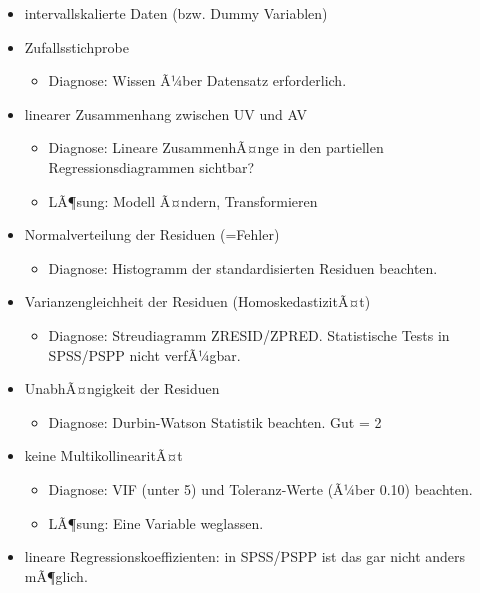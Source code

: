 \documentclass[
]{book}
\providecommand{\tightlist}{%
  \setlength{\itemsep}{0pt}\setlength{\parskip}{0pt}}
\begin{document}
\begin{itemize}
\tightlist
\item
  intervallskalierte Daten (bzw. Dummy Variablen)
\item
  Zufallsstichprobe

  \begin{itemize}
  \tightlist
  \item
    Diagnose: Wissen Ã¼ber Datensatz erforderlich.
  \end{itemize}
\item
  linearer Zusammenhang zwischen UV und AV

  \begin{itemize}
  \tightlist
  \item
    Diagnose: Lineare ZusammenhÃ¤nge in den partiellen Regressionsdiagrammen sichtbar?
  \item
    LÃ¶sung: Modell Ã¤ndern, Transformieren
  \end{itemize}
\item
  Normalverteilung der Residuen (=Fehler)

  \begin{itemize}
  \tightlist
  \item
    Diagnose: Histogramm der standardisierten Residuen beachten.
  \end{itemize}
\item
  Varianzengleichheit der Residuen (HomoskedastizitÃ¤t)

  \begin{itemize}
  \tightlist
  \item
    Diagnose: Streudiagramm ZRESID/ZPRED. Statistische Tests in SPSS/PSPP nicht verfÃ¼gbar.
  \end{itemize}
\item
  UnabhÃ¤ngigkeit der Residuen

  \begin{itemize}
  \tightlist
  \item
    Diagnose: Durbin-Watson Statistik beachten. Gut = 2
  \end{itemize}
\item
  keine MultikollinearitÃ¤t

  \begin{itemize}
  \tightlist
  \item
    Diagnose: VIF (unter 5) und Toleranz-Werte (Ã¼ber 0.10) beachten.
  \item
    LÃ¶sung: Eine Variable weglassen.
  \end{itemize}
\item
  lineare Regressionskoeffizienten: in SPSS/PSPP ist das gar nicht anders mÃ¶glich.
\end{itemize}
\end{document}
